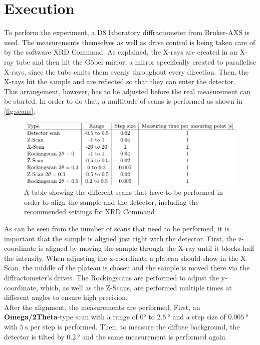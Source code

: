 \section{Execution}
\label{sec:execution}

To perform the experiment, a D8 laboratory diffractometer from Bruker-AXS is used.
The measurements themselves as well as drive control is being taken care of by the software XRD Command.
As explained, the X-rays are created in an X-ray tube and then hit the Göbel mirror, 
a mirror specifically created to parallelise X-rays, since the tube emits them evenly throughout every direction.
Then, the X-rays hit the sample and are reflected so that they can enter the detector. \\

This arrangement, however, has to be adjusted before the real measurement can be started.
In order to do that, a multitude of scans is performed as shown in \autoref{fig:scans}.

\begin{figure}[H]
    \centering
    \includegraphics{figures/scans.pdf}
    \caption{A table showing the different scans that have to be performed in order to align the sample and the detector, 
    including the recommended settings for XRD Command \cite{v44}.}
    \label{fig:scans}
\end{figure}

As can be seen from the number of scans that need to be performed, it is important that the sample is aligned just right with the detector.
First, the z-coordinate is aligned by moving the sample through the X-ray until it blocks half the intensity.
When adjusting the x-coordinate a plateau should show in the X-Scan.
the middle of the plateau is chosen and the sample is moved there via the diffractometer's drives.
The Rockingscans are performed to adjust the y-coordinate, which, as well as the Z-Scans, are performed multiple times at
different angles to ensure high precision. \\

After the alignment, the measurements are performed.
First, an \textbf{Omega/2Theta}-type scan with a range of $0°$ to $\SI{2.5}{\degree}$ and a step size of $\SI{0.005}{\degree}$ with $\SI{5}{\second}$ per step is performed.
Then, to measure the diffuse background, the detector is tilted by $\SI{0.2}{\degree}$ and the same measurement is performed again.


